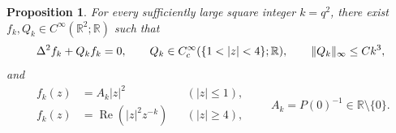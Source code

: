\documentclass[11pt,a4paper,leqno]{amsart}
\numberwithin{equation}{section}
\theoremstyle{landisplain}
\newtheorem{proposition}[theorem]{Proposition}
\theoremstyle{landisdefinition}
\theoremstyle{landisremark}
\newcommand{\R}{\mathbb R}
\newcommand{\Rea}{\operatorname{Re}}
\DeclarePairedDelimiter{\norm}{\lVert}{\rVert}
\begin{document}
\begin{proposition}\label{prop:annular}
For every sufficiently large square integer $k=q^2$, there exist
$f_k,Q_k\in C^\infty(\R^2;\R)$ such that
\begin{equation}\label{eq:annular}
 \Delta^2f_k+Q_kf_k=0,\qquad
 Q_k\in C_c^\infty(\{1<|z|<4\};\R),\qquad
 \norm{Q_k}_\infty\le Ck^3,
\end{equation}
and
\begin{equation}\label{eq:annmodels}
 \begin{aligned}
 f_k(z)&=A_k|z|^2&&(|z|\le1),\\
 f_k(z)&=\Rea(|z|^2z^{-k})&&(|z|\ge4),
 \end{aligned}
 \qquad A_k=P(0)^{-1}\in\R\setminus\{0\}.
\end{equation}
\end{proposition}
\end{document}
